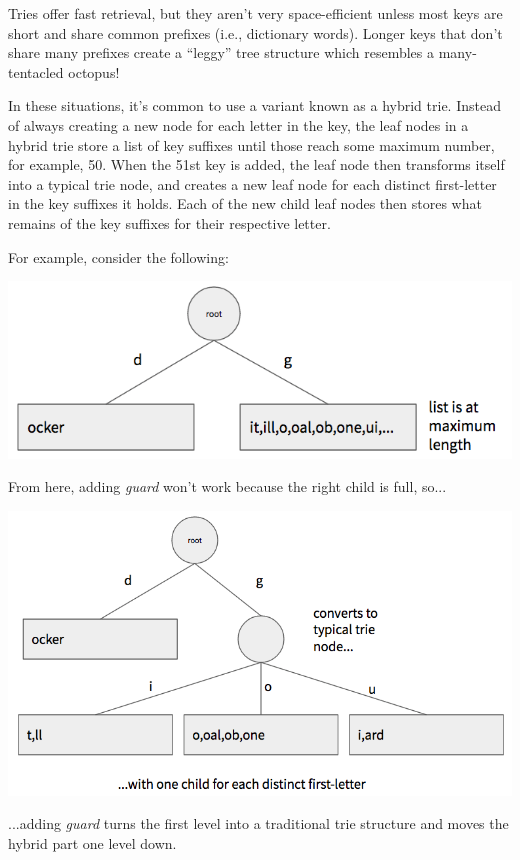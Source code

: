 \documentclass[12pt]{article}
\begin{document}
	Tries offer fast retrieval, but they aren't very space-efficient unless most keys are short and share common prefixes (i.e., dictionary words). Longer keys that don't share many prefixes create a ``leggy'' tree structure which resembles a many-tentacled octopus!
	
	In these situations, it's common to use a variant known as a hybrid trie. Instead of always creating a new node for each letter in the key, the leaf nodes in a hybrid trie store a list of key suffixes until those reach some maximum number, for example, 50. When the 51st key is added, the leaf node then transforms itself into a typical trie node, and creates a new leaf node for each distinct first-letter in the key suffixes it holds. Each of the new child leaf nodes then stores what remains of the key suffixes for their respective letter.
	
	For example, consider the following:
	
	\begin{center}
		\includegraphics[scale=0.5]{img/hybrid-trie-1.png}
	\end{center}
	From here, adding \emph{guard} won't work because the right child is full, so...
	\begin{center}
		\includegraphics[scale=0.5]{img/hybrid-trie-2.png}
	\end{center}
	...adding \emph{guard} turns the first level into a traditional trie structure and moves the hybrid part one level down.
	
\end{document}
